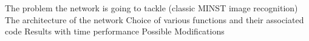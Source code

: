 \startsection[title=Python Implementation]
\startitemize
\startitem 
The problem the network is going to tackle (classic MINST image recognition)
\stopitem
\startitem
The architecture of the network
\stopitem
\startitem
Choice of various functions and their associated code
\stopitem
\startitem
Results with time performance
\stopitem
\startitem
Possible Modifications
\stopitem
\stopitemize
\stopsection